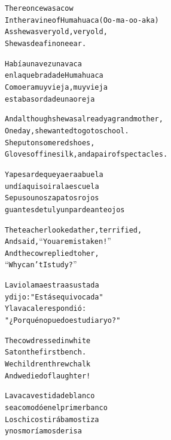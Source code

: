 \documentclass[11pt,a4paper]{article}
\begin{document}
\begin{parcolumns}{2}

\colchunk
{
\begin{alltt}\normalfont
There once was a cow
In the ravine of Humahuaca (Oo-ma-oo-aka)
As she was very old, very old,
She was deaf in one ear.
\end{alltt}
}

\colchunk
{
\begin{alltt}\normalfont
Había una vez una vaca
en la quebrada de Humahuaca
Como era muy vieja, muy vieja
estaba sorda de una oreja
\end{alltt}
}

\colplacechunks

\colchunk
{
\begin{alltt}\normalfont
And although she was already a grandmother,
One day, she wanted to go to school.
She put on some red shoes,
Gloves of fine silk, and a pair of spectacles.
\end{alltt}
}

\colchunk
{
\begin{alltt}\normalfont
Y a pesar de que ya era abuela
un día quiso ir a la escuela
Se puso unos zapatos rojos
guantes de tul y un par de anteojos
\end{alltt}
}

\colplacechunks

\colchunk
{
\begin{alltt}\normalfont
The teacher looked at her, terrified,
And said, “You are mistaken!”
And the cow replied to her,
“Why can’t I study?”
\end{alltt}
}

\colchunk
{
\begin{alltt}\normalfont
La vio la maestra asustada
y dijo: "Estás equivocada"
Y la vaca le respondió:
"¿Por qué no puedo estudiar yo?"
\end{alltt}
}

\colplacechunks

\colchunk
{
\begin{alltt}\normalfont
The cow dressed in white
Sat on the first bench.
We children threw chalk
And we died of laughter!
\end{alltt}
}

\colchunk
{
\begin{alltt}\normalfont
La vaca vestida de blanco
se acomodó en el primer banco
Los chicos tirábamos tiza
y nos moríamos de risa
\end{alltt}
}

\colplacechunks


\end{parcolumns}
\end{document}
